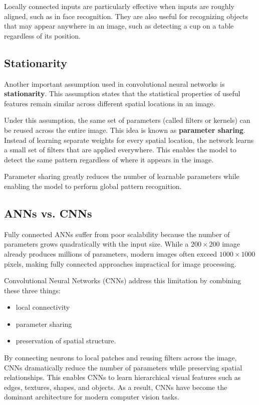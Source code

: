 \documentclass{article}
\begin{document}
Locally connected inputs are particularly effective when inputs are roughly aligned, such as in face recognition. They are also useful for recognizing objects that may appear anywhere in an image, such as detecting a cup on a table regardless of its position.

\subsection{Stationarity}

Another important assumption used in convolutional neural networks is \textbf{stationarity}. This assumption states that the statistical properties of useful features remain similar across different spatial locations in an image.

Under this assumption, the same set of parameters (called filters or kernels) can be reused across the entire image. This idea is known as \textbf{parameter sharing}. Instead of learning separate weights for every spatial location, the network learns a small set of filters that are applied everywhere. This enables the model to detect the same pattern regardless of where it appears in the image.

Parameter sharing greatly reduces the number of learnable parameters while enabling the model to perform global pattern recognition.

\subsection{ANNs vs. CNNs}

Fully connected ANNs suffer from poor scalability because the number of parameters grows quadratically with the input size. While a $200 \times 200$ image already produces millions of parameters, modern images often exceed $1000 \times 1000$ pixels, making fully connected approaches impractical for image processing.

Convolutional Neural Networks (CNNs) address this limitation by combining these three things:
\begin{itemize}
    \item local connectivity
    \item parameter sharing
    \item preservation of spatial structure.
\end{itemize}

By connecting neurons to local patches and reusing filters across the image, CNNs dramatically reduce the number of parameters while preserving spatial relationships. This enables CNNs to learn hierarchical visual features such as edges, textures, shapes, and objects. As a result, CNNs have become the dominant architecture for modern computer vision tasks.
\end{document}
